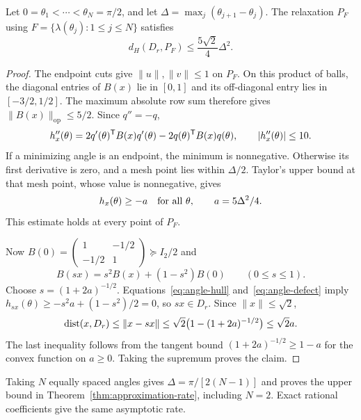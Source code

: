 \begin{lemma}\label{lem:angle-mesh}
Let $0=\theta_1<\cdots<\theta_N=\pi/2$, and let
$\Delta=\max_j(\theta_{j+1}-\theta_j)$. The relaxation $P_F$ using
$F=\{\lambda(\theta_j):1\leq j\leq N\}$ satisfies
\[
 d_H(D_r,P_F)\leq\frac{5\sqrt2}{4}\Delta^2.
\]
\end{lemma}
\begin{proof}
The endpoint cuts give $\|u\|,\|v\|\leq1$ on $P_F$.
On this product of balls, the diagonal entries of $B(x)$ lie in
$[0,1]$ and its off-diagonal entry lies in $[-3/2,1/2]$.
The maximum absolute row sum therefore gives
$\|B(x)\|_{\mathrm{op}}\leq5/2$. Since $q''=-q$,
\[
 h_x''(\theta)=2q'(\theta)^{\mathsf T} B(x)q'(\theta)
                 -2q(\theta)^{\mathsf T} B(x)q(\theta),
 \qquad |h_x''(\theta)|\leq10.
\]
If a minimizing angle is an endpoint, the minimum is nonnegative.
Otherwise its first derivative is zero, and a mesh point lies within
$\Delta/2$. Taylor's upper bound at that mesh point, whose value is
nonnegative, gives
\begin{equation}\label{eq:angle-defect}
 h_x(\theta)\geq-a\quad\hbox{for all }\theta,
 \qquad a=5\Delta^2/4.
\end{equation}
This estimate holds at every point of $P_F$.

Now $B(0)=\begin{pmatrix}1&-1/2\\-1/2&1\end{pmatrix}
\succeq I_2/2$ and
\[
 B(sx)=s^2B(x)+(1-s^2)B(0)\qquad(0\leq s\leq1).
\]
Choose $s=(1+2a)^{-1/2}$. Equations~\eqref{eq:angle-hull}
and~\eqref{eq:angle-defect} imply
$h_{sx}(\theta)\geq-s^2a+(1-s^2)/2=0$, so $sx\in D_r$.
Since $\|x\|\leq\sqrt2$,
\[
 \operatorname{dist}(x,D_r)\leq\|x-sx\|
 \leq\sqrt2\bigl(1-(1+2a)^{-1/2}\bigr)\leq\sqrt2 a.
\]
The last inequality follows from the tangent bound
$(1+2a)^{-1/2}\geq1-a$ for the convex function on $a\geq0$.
Taking the supremum proves the claim.
\end{proof}

Taking $N$ equally spaced angles gives
$\Delta=\pi/[2(N-1)]$ and proves the upper bound in
Theorem~\ref{thm:approximation-rate}, including $N=2$.
Exact rational coefficients give the same asymptotic rate.

